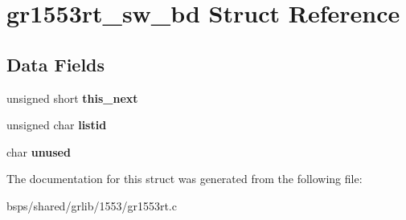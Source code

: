 \hypertarget{structgr1553rt__sw__bd}{}\section{gr1553rt\+\_\+sw\+\_\+bd Struct Reference}
\label{structgr1553rt__sw__bd}
\subsection*{Data Fields}
\begin{DoxyCompactItemize}
\item 
\mbox{\label{structgr1553rt__sw__bd_a102db8bd722a1bc388259c185a2b0dc2}} 
unsigned short {\bfseries this\+\_\+next}
\item 
\mbox{\label{structgr1553rt__sw__bd_ac03d6784b226221f677adb987c2707fb}} 
unsigned char {\bfseries listid}
\item 
\mbox{\label{structgr1553rt__sw__bd_a8efefc33db31b46d572024c9d15debff}} 
char {\bfseries unused}
\end{DoxyCompactItemize}


The documentation for this struct was generated from the following file\+:\begin{DoxyCompactItemize}
\item 
bsps/shared/grlib/1553/gr1553rt.\+c\end{DoxyCompactItemize}
